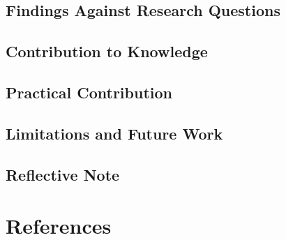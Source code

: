 \documentclass[
  12pt,
  letterpaper,
  12pt,
  oneside,
  english,
  onehalfspacing,
  headsepline]{MastersDoctoralThesis}
\begin{document}
\section{Findings Against Research
Questions}\label{findings-against-research-questions}

\section{Contribution to Knowledge}\label{contribution-to-knowledge}

\section{Practical Contribution}\label{practical-contribution}

\section{Limitations and Future Work}\label{limitations-and-future-work}

\section{Reflective Note}\label{reflective-note}


\chapter*{References}\label{references}

\end{document}

